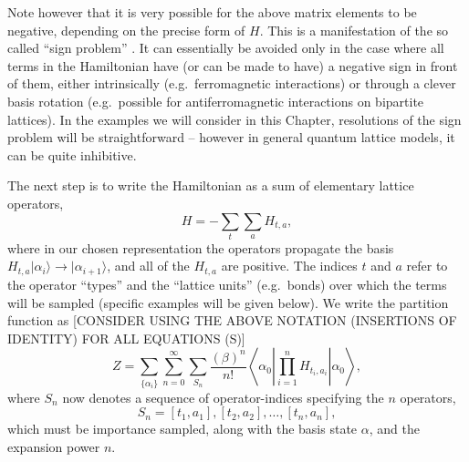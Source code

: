 \documentclass[vecphys]{svmult}
\begin{document}
Note however that it is very possible for the above matrix elements to be negative, depending on the precise form of $H$.
This is a manifestation of the so called ``sign problem'' \cite{Melko:Henelius00}.  It can 
essentially be avoided only in the case where all terms in the Hamiltonian have (or can be made to have) a negative sign in front of them, 
either intrinsically (e.g.~ferromagnetic interactions) or through a clever basis rotation (e.g.~possible for antiferromagnetic interactions on bipartite lattices).  In the examples we will consider in this Chapter, resolutions of the sign problem will be straightforward -- however in general quantum lattice models, it can be quite inhibitive.

The next step is to write the Hamiltonian as a sum of elementary lattice operators,
\begin{equation}
H=-\sum_t \sum_a H_{t,a}, \label{Hdecomp}
\label{Hsum}
\end{equation}
where in our chosen representation the operators propagate the basis $H_{t,a} |\alpha_i \rangle \rightarrow | \alpha_{i+1} \rangle$, and all of the $H_{t,a}$ are positive.  The indices $t$ and $a$ refer to the operator ``types'' and the ``lattice units'' (e.g.~bonds) over which the terms will be sampled (specific examples will be given below).  We write the partition function as {\color{red}[CONSIDER USING THE ABOVE NOTATION (INSERTIONS OF IDENTITY) FOR ALL EQUATIONS (S)]}
\begin{equation}
Z=\sum_{ \{ \alpha_i \} } \sum_{n=0}^{\infty} \sum_{S_n} \frac{ (\beta)^n}{n !}
 \left\langle{\alpha_0  \left|  \prod_{i=1}^{n} {H_{t_i,a_i}} \right| \alpha_0   }\right\rangle,
 \label{Zsse2b}
\end{equation}
where $S_n$ now denotes a sequence of operator-indices specifying the $n$ operators,
\begin{equation}
S_n = [t_1,a_1],[t_2,a_2], \ldots ,[t_n,a_n],
\end{equation}
which must be importance sampled, along with the basis state $\alpha$, and the expansion power $n$.   
\end{document}
